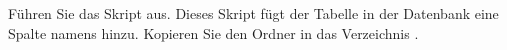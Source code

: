 \item Führen Sie das Skript  aus. Dieses
Skript fügt der Tabelle  in der Datenbank
 eine Spalte namens  hinzu. Kopieren Sie
den Ordner  in das
Verzeichnis .
